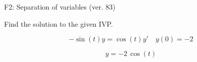 \begin{exercise}
  \begin{exerciseTitle}F2: Separation of variables (ver. 83)\end{exerciseTitle}
  \begin{exerciseStatement}
    
Find the solution to the given IVP.

    
\[-\sin\left(t\right) y= \cos\left(t\right) y'\hspace{1em} y\left( 0 \right)= -2\]

  \end{exerciseStatement}
  \begin{exerciseAnswer}
    
\[y= -2 \, \cos\left(t\right)\]

  \end{exerciseAnswer}
\end{exercise}